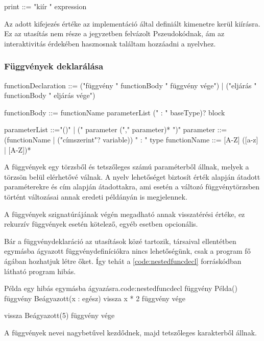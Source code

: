\begin{ebnf}
print ::= "kiír " expression
\end{ebnf}

Az adott kifejezés értéke az implementáció által definiált kimenetre kerül kiírásra. Ez az utasítás nem része a jegyzetben felvázolt Pszeudokódnak, ám az interaktivitás érdekében hasznosnak találtam hozzáadni a nyelvhez.

\subsubsection{Függvények deklarálása}
\label{sec:funcdecl}

\begin{ebnf}
functionDeclaration ::= ("függvény " functionBody " függvény vége")
                      | ("eljárás " functionBody " eljárás vége")

functionBody ::= functionName parameterList (" : " baseType)? block

parameterList ::="()" | (" parameter ("," parameter)* ")"
parameter ::= (functionName | ("címszerint"? variable)) " : " type
functionName ::= [A-Z] ([a-z] | [A-Z])*
\end{ebnf}

A függvények egy törzsből és tetszőleges számú paraméterből állnak, melyek a törzsön belül elérhetővé válnak. A nyelv lehetőséget biztosít érték alapján átadott paraméterekre és cím alapján átadottakra, ami esetén a változó függvénytörzsben történt változásai annak eredeti példányán is megjelennek.

A függvények szignatúrájának végén megadható annak visszatérési értéke, ez rekurzív függvények esetén kötelező, egyéb esetben opcionális.

Bár a függvénydeklaráció az utasítások közé tartozik, társaival ellentétben egymásba ágyazott függvénydefiníciókra nincs lehetőségünk, csak a program fő ágában hozhatjuk létre őket. Így tehát a \ref{code:nestedfuncdecl} forráskódban látható program hibás.

\begin{code}{Példa egy hibás egymásba ágyazásra.}{code:nestedfuncdecl}
függvény Példa()
    függvény Beágyazott(x : egész)
        vissza x * 2
    függvény vége

    vissza Beágyazott(5)
függvény vége
\end{code}

A függvények nevei nagybetűvel kezdődnek, majd tetszőleges karakterből állnak.


